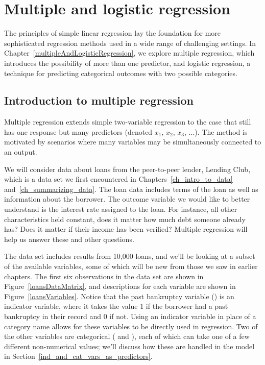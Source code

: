 \chapter{Multiple and logistic regression}
\label{multipleRegressionAndANOVA}
\label{multipleAndLogisticRegression}
\label{ch_regr_mult_and_log}
\renewcommand{\chapterfolder}{ch_regr_mult_and_log}

The principles of simple linear regression lay the foundation for more sophisticated regression methods used in a wide range of challenging settings. In Chapter~\ref{multipleAndLogisticRegression}, we explore multiple regression, which introduces the possibility of more than one predictor, and logistic regression, a technique for predicting categorical outcomes with two possible categories.




\section{Introduction to multiple regression}
\label{introductionToMultipleRegression}


Multiple regression extends simple two-variable regression to the case that still has one response but many predictors (denoted $x_1$, $x_2$, $x_3$, ...). The method is motivated by scenarios where many variables may be simultaneously connected to an output.


\newcommand{\loNcomma}{10,000}
\newcommand{\loN}{10000}

We will consider data about loans from the peer-to-peer lender,
Lending Club, which is a data set we first encountered in
Chapters~\ref{ch_intro_to_data}
and~\ref{ch_summarizing_data}.
The loan data includes terms of the loan as well as
information about the borrower.
The outcome variable we would like to better understand
is the interest rate assigned to the loan.
For instance, all other characteristics held constant,
does it matter how much debt someone already has?
Does it matter if their income has been verified?
Multiple regression will help us answer these and other questions.

The data set  includes results from \loNcomma{} loans,
and we'll be looking at a subset of the available variables,
some of which will be new from those we saw in earlier chapters.
The first six observations in the data set are shown in
Figure~\ref{loansDataMatrix},
and descriptions for each variable are shown in
Figure~\ref{loansVariables}.
Notice that the past bankruptcy variable ()
is an indicator variable,
where it takes the value 1 if the borrower had a past
bankruptcy in their record and 0 if not.
Using an indicator variable in place of a category name
allows for these variables to be directly used in regression.
Two of the other variables are
categorical
( and ), each of which
can take one of a few different non-numerical values;
we'll discuss how these are handled in the model in
Section~\ref{ind_and_cat_vars_as_predictors}.


